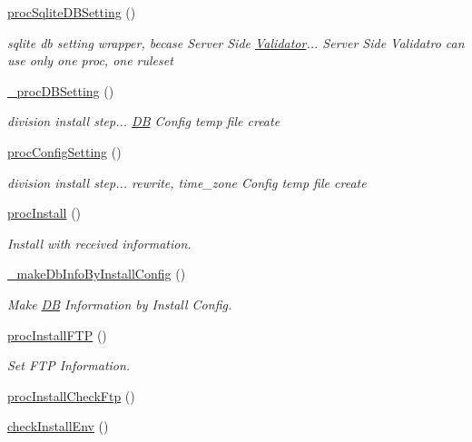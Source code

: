 \begin{DoxyCompactItemize}
\hyperlink{classinstallController_ad850902e30ecd8f0d80f82579f1f867f}{proc\-Sqlite\-D\-B\-Setting} ()
\begin{DoxyCompactList}\small\item\em sqlite db setting wrapper, becase Server Side \hyperlink{classValidator}{Validator}... Server Side Validatro can use only one proc, one ruleset \end{DoxyCompactList}\item 
\hyperlink{classinstallController_a159bf71d02aad0ae607b2acc71b10618}{\-\_\-proc\-D\-B\-Setting} ()
\begin{DoxyCompactList}\small\item\em division install step... \hyperlink{classDB}{D\-B} Config temp file create \end{DoxyCompactList}\item 
\hyperlink{classinstallController_a070de62caeaa36e7bfa2b50be905cfde}{proc\-Config\-Setting} ()
\begin{DoxyCompactList}\small\item\em division install step... rewrite, time\-\_\-zone Config temp file create \end{DoxyCompactList}\item 
\hyperlink{classinstallController_a41026755146b829fe87b83bca3962938}{proc\-Install} ()
\begin{DoxyCompactList}\small\item\em Install with received information. \end{DoxyCompactList}\item 
\hyperlink{classinstallController_aa6f541715f9abe418e14f47d9e6fa789}{\-\_\-make\-Db\-Info\-By\-Install\-Config} ()
\begin{DoxyCompactList}\small\item\em Make \hyperlink{classDB}{D\-B} Information by Install Config. \end{DoxyCompactList}\item 
\hyperlink{classinstallController_af955577b33b8125145df5e18f10c38a5}{proc\-Install\-F\-T\-P} ()
\begin{DoxyCompactList}\small\item\em Set F\-T\-P Information. \end{DoxyCompactList}\item 
\hyperlink{classinstallController_aebbed72d5e11663013b1c1cbe281fcfe}{proc\-Install\-Check\-Ftp} ()
\item 
\hyperlink{classinstallController_a6cd48bffa15badc616c0b860c59d410e}{check\-Install\-Env} ()

\end{DoxyCompactItemize}
